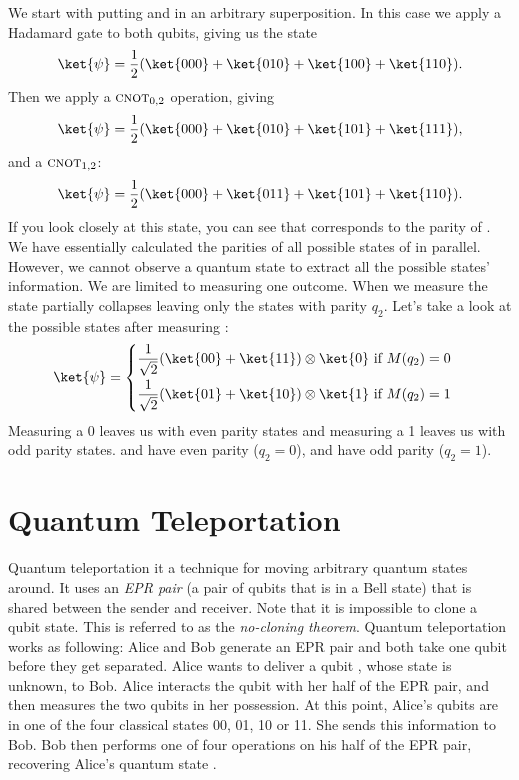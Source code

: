 \documentclass[11pt, notitlepage]{report}
\begin{document}
We start with putting  and  in an arbitrary superposition. In this case we apply a Hadamard gate to both qubits, giving us the state
\begin{equation}
  \ket{\psi} = \dfrac{1}{2}(\ket{000} + \ket{010} + \ket{100} + \ket{110}).
\end{equation}
Then we apply a $\textsc{cnot}_{0,2}$ operation, giving
\begin{equation}
  \ket{\psi} = \dfrac{1}{2}(\ket{000} + \ket{010} + \ket{101} + \ket{111}),
\end{equation}
and a $\textsc{cnot}_{1,2}$:
\begin{equation}
  \ket{\psi} = \dfrac{1}{2}(\ket{000} + \ket{011} + \ket{101} + \ket{110}).
\end{equation}
If you look closely at this state, you can see that  corresponds to the parity of . We have essentially calculated the parities of all possible states of  in parallel. However, we cannot observe a quantum state to extract all the possible states' information. We are limited to measuring one outcome. When we measure  the state partially collapses leaving only the states with parity $q_2$. Let's take a look at the possible states after measuring :
\begin{equation}
\ket{\psi} = 
\begin{cases}
\begin{aligned}
\dfrac{1}{\sqrt2}(\ket{00} + \ket{11}) \otimes \ket{0} & \text{ if } M(q_2) = 0 \\
\dfrac{1}{\sqrt2}(\ket{01} + \ket{10}) \otimes \ket{1} & \text{ if } M(q_2) = 1
\end{aligned}
\end{cases}
\end{equation}
Measuring a 0 leaves us with even parity states and measuring a 1 leaves us with odd parity states.  and  have even parity ($q_2 = 0$),  and  have odd parity ($q_2 = 1$).

\section{Quantum Teleportation}
Quantum teleportation it a technique for moving arbitrary quantum states around. It uses an \emph{EPR pair} (a pair of qubits that is in a Bell state) that is shared between the sender and receiver. Note that it is impossible to clone a qubit state. This is referred to as the \emph{no-cloning theorem}. Quantum teleportation works as following: Alice and Bob generate an EPR pair and both take one qubit before they get separated. Alice wants to deliver a qubit \ket{\phi}, whose state is unknown, to Bob. Alice interacts the qubit \ket{\phi} with her half of the EPR pair, and then measures the two qubits in her possession. At this point, Alice's qubits are in one of the four classical states 00, 01, 10 or 11. She sends this information to Bob. Bob then performs one of four operations on his half of the EPR pair, recovering Alice's quantum state \ket{\phi}.
\end{document}
